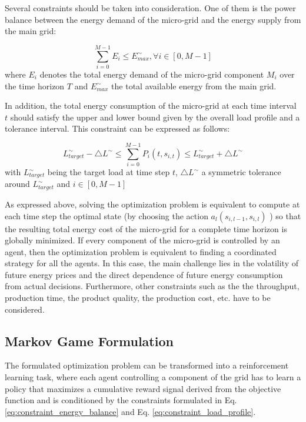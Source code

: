 Several constraints should be taken into consideration. One of them is the power balance between the energy demand of the micro-grid and the energy supply from the main grid:

\begin{equation}
\label{eq:constraint_energy_balance}	
	\sum_{i=0}^{M-1}{ E_i} \leq E_{max}^\sim,  \forall i \in [0, M-1]
\end{equation}
where $E_i$ denotes the total energy demand of the micro-grid component $M_i$ over the time horizon $T$ and $E_{max}^\sim$ the total available energy from the main grid.

In addition, the total energy consumption of the micro-grid at each time interval $t$ should satisfy the upper and lower bound given by the overall load profile and a tolerance interval. This constraint can be expressed as follows:

\begin{equation}
\label{eq:constraint_load_profile}	
	L_{target}^\sim - \triangle L^\sim \leq {\sum_{i=0}^{M-1}{ P_i (t, s_{i,t})} } \leq L_{target}^\sim + \triangle L^\sim
\end{equation} 
with $L_{target}^\sim$  being the target load at time step $t$, $\triangle L^\sim$  a symmetric tolerance around $L_{target}^\sim$ and $ i \in [0, M-1]$

As expressed above, solving the optimization problem is equivalent to compute at each time step the optimal state (by choosing the action $a_l (s_{i,l-1},s_{i,l})$ ) so that the resulting total energy cost of the micro-grid for a complete time horizon is globally minimized. If every component of the micro-grid is controlled by an agent, then the optimization problem is equivalent to finding a coordinated strategy for all the agents. In this case, the main challenge lies in the volatility of future energy prices and the direct dependence of future energy consumption from actual decisions. Furthermore, other constraints such as the the throughput, production time, the product quality, the production cost, etc. have to be considered.

\subsection{Markov Game Formulation}
The formulated optimization problem can be transformed into a reinforcement learning task, where each agent controlling a component of the grid has to learn a policy that maximizes a cumulative reward signal derived from the objective function and is conditioned by the constraints formulated in Eq. \ref{eq:constraint_energy_balance} and Eq. \ref{eq:constraint_load_profile}. 

